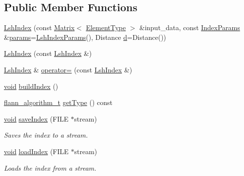 \subsection*{Public Member Functions}
\begin{DoxyCompactItemize}
\item 
\hyperlink{classcvflann_1_1LshIndex_a6ba735129e80fb9a229d5111f42300b4}{Lsh\-Index} (const \hyperlink{classcvflann_1_1Matrix}{Matrix}$<$ \hyperlink{classcvflann_1_1LshIndex_a2f042ae6416a2a78d1d9a7f622d1e284}{Element\-Type} $>$ \&input\-\_\-data, const \hyperlink{namespacecvflann_a742b4c7076c21012054af74a9ee48289}{Index\-Params} \&\hyperlink{compat_8hpp_a0480a03ecc41b20cde376602531d9270}{params}=\hyperlink{structcvflann_1_1LshIndexParams}{Lsh\-Index\-Params}(), Distance \hyperlink{legacy_8hpp_a6f364afbe132c4ecfea48bde1b0618ba}{d}=Distance())
\item 
\hyperlink{classcvflann_1_1LshIndex_ae8f1d06ab218e50c70d371bc453de37f}{Lsh\-Index} (const \hyperlink{classcvflann_1_1LshIndex}{Lsh\-Index} \&)
\item 
\hyperlink{classcvflann_1_1LshIndex}{Lsh\-Index} \& \hyperlink{classcvflann_1_1LshIndex_a93d4a58f0f102bd549002a4b2d224323}{operator=} (const \hyperlink{classcvflann_1_1LshIndex}{Lsh\-Index} \&)
\item 
\hyperlink{legacy_8hpp_a8bb47f092d473522721002c86c13b94e}{void} \hyperlink{classcvflann_1_1LshIndex_afc69f3b8bb0b70d6508f02afedefcd4f}{build\-Index} ()
\item 
\hyperlink{namespacecvflann_a4e3e6c98d774ea77fd7f0045c9bc7817}{flann\-\_\-algorithm\-\_\-t} \hyperlink{classcvflann_1_1LshIndex_afa13ae86bc473be70be44f5db63d1a06}{get\-Type} () const 
\item 
\hyperlink{legacy_8hpp_a8bb47f092d473522721002c86c13b94e}{void} \hyperlink{classcvflann_1_1LshIndex_a2c4f2730a643239a5a633acd2534b95d}{save\-Index} (F\-I\-L\-E $\ast$stream)
\begin{DoxyCompactList}\small\item\em Saves the index to a stream. \end{DoxyCompactList}\item 
\hyperlink{legacy_8hpp_a8bb47f092d473522721002c86c13b94e}{void} \hyperlink{classcvflann_1_1LshIndex_a1dabad22feab89368be19fedf17b2511}{load\-Index} (F\-I\-L\-E $\ast$stream)
\begin{DoxyCompactList}\small\item\em Loads the index from a stream. \end{DoxyCompactList}\item 

\end{DoxyCompactItemize}
